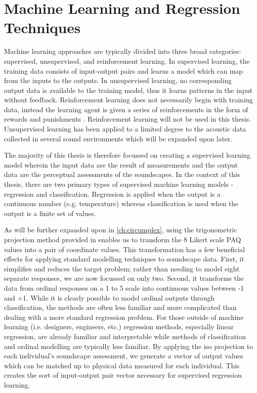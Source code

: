 \section{Machine Learning and Regression Techniques}
Machine learning approaches are typically divided into three broad categories: supervised, unsupervised, and reinforcement learning. In supervised learning, the training data consists of input-output pairs and learns a model which can map from the inputs to the outputs. In unsupervised learning, no corresponding output data is available to the training model, thus it learns patterns in the input without feedback. Reinforcement learning does not necessarily begin with training data, instead the learning agent is given a series of reinforcements in the form of rewards and punishments \citep{StuartRussell2021}. Reinforcement learning will not be used in this thesis. Unsupervised learning has been applied to a limited degree to the acoustic data collected in several sound environments which will be expanded upon later. 

The majority of this thesis is therefore focussed on creating a supervised learning model wherein the input data are the result of measurements and the output data are the perceptual assessments of the soundscapes. In the context of this thesis, there are two primary types of supervised machine learning models - regression and classification. Regression is applied when the output is a continuous number (e.g. temperature) whereas classification is used when the output is a finite set of values. 

As will be further expanded upon in \cref{ch:circumplex}, using the trigonometric projection method provided in \citet{ISO12913Part3} enables us to transform the 8 Likert scale PAQ values into a pair of coordinate values. This transformation has a few beneficial effects for applying standard modelling techniques to soundscape data. First, it simplifies and reduces the target problem; rather than needing to model eight separate responses, we are now focussed on only two. Second, it transforms the data from ordinal responses on a 1 to 5 scale into continuous values between -1 and +1. While it is clearly possible to model ordinal outputs through classification, the methods are often less familiar and more complicated than dealing with a more standard regression problem. For those outside of machine learning (i.e. designers, engineers, etc.) regression methods, especially linear regression, are already familiar and interpretable while methods of classification and ordinal modelling are typically less familiar. By applying the \gls{iso} projection to each individual's soundscape assessment, we generate a vector of output values which can be matched up to physical data measured for each individual. This creates the sort of input-output pair vector necessary for supervised regression learning.

